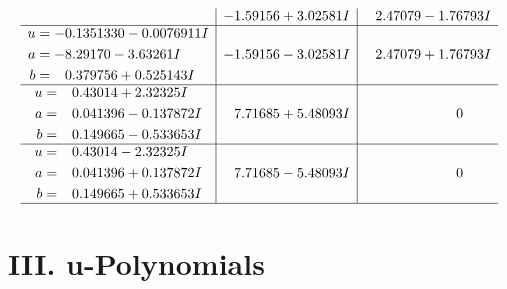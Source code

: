 \documentclass[1p]{elsarticle_modified}
\theoremstyle{definition}
\begin{document}
$$\begin{array}{c|c|c}
 & -1.59156 + 3.02581 I & \phantom{-}2.47079 - 1.76793 I \\ \hline\begin{aligned}
u &= -0.1351330 - 0.0076911 I \\
a &= -8.29170 - 3.63261 I \\
b &= \phantom{-}0.379756 + 0.525143 I\end{aligned}
 & -1.59156 - 3.02581 I & \phantom{-}2.47079 + 1.76793 I \\ \hline\begin{aligned}
u &= \phantom{-}0.43014 + 2.32325 I \\
a &= \phantom{-}0.041396 - 0.137872 I \\
b &= \phantom{-}0.149665 - 0.533653 I\end{aligned}
 & \phantom{-}7.71685 + 5.48093 I & \phantom{-0.000000 } 0 \\ \hline\begin{aligned}
u &= \phantom{-}0.43014 - 2.32325 I \\
a &= \phantom{-}0.041396 + 0.137872 I \\
b &= \phantom{-}0.149665 + 0.533653 I\end{aligned}
 & \phantom{-}7.71685 - 5.48093 I & \phantom{-0.000000 } 0\\
 \hline 
 \end{array}$$\newpage
\newpage\renewcommand{\arraystretch}{1}
\centering \section*{ III. u-Polynomials}
\end{document}
